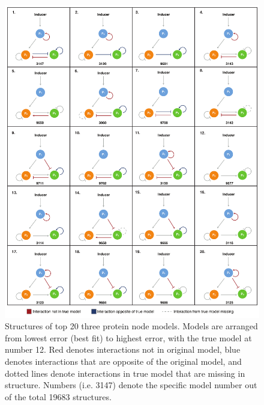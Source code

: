 \documentclass[12pt]{article}
\begin{document}
\begin{figure}\centering
\includegraphics[width=1.0\textwidth]{./figs_chp3/3node_models_Table.pdf}
\caption{Structures of top 20 three protein node models. Models are arranged from lowest error (best fit) to highest error, with the true model at number 12. Red denotes interactions not in original model, blue denotes interactions that are opposite of the original model, and dotted lines denote interactions in true model that are missing in structure. Numbers (i.e. 3147) denote the specific model number out of the total 19683 structures.}
\label{fg:3node_models_Table}
\end{figure}

\clearpage
\end{document}
